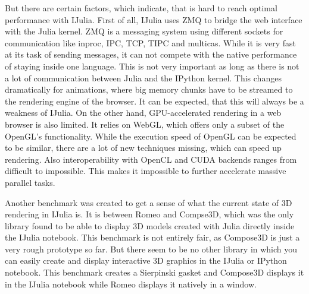 But there are certain factors, which indicate, that is hard to reach optimal performance with IJulia.
First of all, IJulia uses ZMQ to bridge the web interface with the Julia kernel.
ZMQ is a messaging system using different sockets for communication like inproc, IPC, TCP, TIPC and multicas.
While it is very fast at its task of sending messages, it can not compete with the native performance of staying inside one language.
This is not very important as long as there is not a lot of communication between Julia and the IPython kernel. This changes dramatically for animations, where big memory chunks have to be streamed to the rendering engine of the browser. It can be expected, that this will always be a weakness of IJulia.
On the other hand, GPU-accelerated rendering in a web browser is also limited.
It relies on WebGL, which offers only a subset of the OpenGL's functionality. While the execution speed of OpenGL can be expected to be similar, there are a lot of new techniques missing, which can speed up rendering. Also interoperability with  OpenCL and CUDA backends ranges from difficult to impossible. 
This makes it impossible to further accelerate massive parallel tasks.

Another benchmark was created to get a sense of what the current state of 3D rendering in IJulia is.
It is between Romeo and Compse3D, which was the only library found to be able to display 3D models created with Julia directly inside the IJulia notebook.
This benchmark is not entirely fair, as Compose3D is just a very rough prototype so far. 
But there seem to be no other library in which you can easily create and display interactive 3D graphics in the IJulia or IPython notebook. 
This benchmark creates a Sierpinski gasket and Compose3D displays it in the IJulia notebook while Romeo displays it natively in a window.

